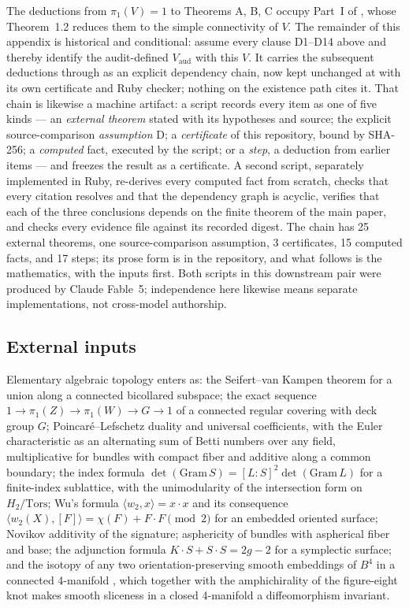 \documentclass[11pt]{article}
\newcommand{\pione}{\pi_1}
\theoremstyle{definition}
\begin{document}
The deductions from $\pione(V)=1$ to Theorems A, B, C occupy Part~I of
\cite{Wuebben}, whose Theorem~1.2 reduces them to the simple connectivity
of $V$.  The remainder of this appendix is historical and conditional:
assume every clause D1--D14 above and thereby identify the audit-defined
$V_{\mathrm{aud}}$ with this $V$.  It carries the subsequent deductions
through as an explicit dependency chain, now kept unchanged at
with its own certificate and Ruby checker; nothing on the existence path
cites it.  That chain is likewise a machine artifact: a script
records every item as one of five kinds --- an \emph{external theorem}
stated with its hypotheses and source; the explicit source-comparison
\emph{assumption} D; a \emph{certificate} of this
repository, bound by SHA-256; a \emph{computed} fact, executed by the
script; or a \emph{step}, a deduction from earlier items --- and freezes
the result as a certificate. A second script, separately implemented in
Ruby, re-derives every computed fact from scratch, checks that every
citation resolves and that the dependency graph is acyclic, verifies that
each of the three conclusions depends on the finite theorem of the main paper, and
checks every evidence file against its recorded digest. The chain has 25
external theorems, one source-comparison assumption, 3 certificates, 15
computed facts, and 17 steps; its
prose form is in the repository, and what follows is the mathematics,
with the inputs first. Both scripts in this downstream pair were produced
by Claude Fable~5; independence here likewise means separate implementations,
not cross-model authorship.

\subsection*{External inputs}

Elementary algebraic topology enters as: the Seifert--van Kampen theorem
for a union along a connected bicollared subspace; the exact sequence
$1\to\pione(Z)\to\pione(W)\to G\to1$ of a connected regular covering with
deck group $G$; Poincar\'e--Lefschetz duality and universal coefficients,
with the Euler characteristic as an alternating sum of Betti numbers over
any field, multiplicative for bundles with compact fiber and additive
along a common boundary; the index formula $\det(\mathrm{Gram}\,S)=[L:S]^2
\det(\mathrm{Gram}\,L)$ for a finite-index sublattice, with the
unimodularity of the intersection form on $H_2/\mathrm{Tors}$; Wu's
formula $\langle w_2,x\rangle=x\cdot x$ and its consequence
$\langle w_2(X),[F]\rangle=\chi(F)+F\cdot F \pmod 2$ for an embedded
oriented surface; Novikov additivity of the signature; asphericity of
bundles with aspherical fiber and base; the adjunction formula
$K\cdot S+S\cdot S=2g-2$ for a symplectic surface; and the isotopy of
any two orientation-preserving smooth embeddings of $B^4$ in a connected
4-manifold \cite{Palais}, which together with the amphichirality of the
figure-eight knot makes smooth sliceness in a closed 4-manifold a
diffeomorphism invariant.
\end{document}
